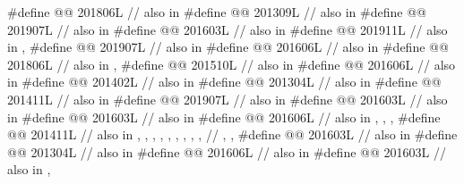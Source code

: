 \begin{codeblock}
#define @@            201806L // also in 
#define @@                   201309L // also in 
#define @@       201907L // also in 
#define @@                      201603L // also in 
#define @@                           201911L // also in , 
#define @@                             201907L // also in 
#define @@                           201606L // also in 
#define @@           201806L // also in , 
#define @@                    201510L // also in 
#define @@                   201606L // also in 
#define @@             201402L // also in 
#define @@                       201304L // also in 
#define @@                   201411L // also in 
#define @@                    201907L // also in 
#define @@            201603L // also in 
#define @@                   201603L // also in 
#define @@                      201606L
  // also in , , , 
#define @@        201411L
  // also in , , , , , , , , ,
  // , , 
#define @@                            201603L // also in 
#define @@                    201304L // also in 
#define @@                          201606L // also in 
#define @@                201603L // also in , 

\end{codeblock}
